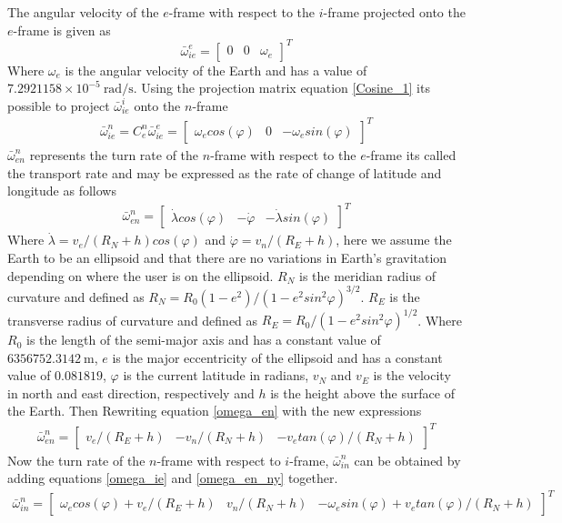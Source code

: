 The angular velocity of the $e$-frame with respect to the $i$-frame projected onto the $e$-frame is given as
\begin{equation}
\bar{\omega}_{ie}^e = 
\begin{bmatrix}
0 & 0 & \omega_e
\end{bmatrix}^T
\end{equation}
Where $\omega_e$ is the angular velocity of the Earth and has a value of
$7.2921158 \times 10^{-5}~\textrm{rad/s}$\cite{nonlinear}. Using the projection matrix equation \eqref{Cosine_1} its possible to project $\bar{\omega}_ {ie}^i$ onto the $n$-frame
\begin{align}
\bar{\omega}_{ie}^n=C_e^n\bar{\omega}_{ie}^e=
\begin{bmatrix}
\omega_e cos(\varphi) & 0 & -\omega_e sin(\varphi)
\end{bmatrix}^T
\label{omega_ie}
\end{align}
$\bar{\omega}_{en}^n$ represents the turn rate of the $n$-frame with respect to the $e$-frame its called the transport rate and may be expressed as the rate of change of latitude and longitude as follows
\begin{align}
\bar{\omega}_{en}^n=
\begin{bmatrix}
\dot{\lambda}cos(\varphi) & -\dot{\varphi} & -\dot{\lambda}sin(\varphi)
\end{bmatrix}^T
\label{omega_en}
\end{align}
Where $\dot{\lambda}=v_e/(R_N+h)cos(\varphi)$ and $\dot{\varphi}=v_n/(R_E+h)$, here we assume the Earth to be an ellipsoid and that there are no variations in Earth's gravitation depending on where the user is on the ellipsoid. $R_N$ is the meridian radius of curvature and defined as $R_N=R_0(1-e^2)/(1-e^2sin^2\varphi)^{3/2}$\cite{nonlinear}. $R_E$ is the transverse radius of curvature and defined as $R_E=R_0/(1-e^2sin^2\varphi)^{1/2}$. Where $R_0$ is the length of the semi-major axis and has a constant value of $6356752.3142~\textrm{m}$, $e$ is the major eccentricity of the ellipsoid and has a constant value of $0.081819$, $\varphi$ is the current latitude in radians, $v_N$ and $v_E$ is the velocity in north and east direction, respectively and $h$ is the height above the surface of the Earth. Then Rewriting equation \eqref{omega_en} with the new expressions
\begin{align}
\bar{\omega}_{en}^n=
\begin{bmatrix}
v_e/(R_E+h) & -v_n/(R_N+h) & -v_e tan(\varphi)/(R_N+h)
\end{bmatrix}^T \label{omega_en_ny}
\end{align}
Now the turn rate of the $n$-frame with respect to $i$-frame, $\bar{\omega}_{in}^n$ can be obtained by adding equations \eqref{omega_ie} and \eqref{omega_en_ny} together.
\begin{align}
\bar{\omega}_{in}^n=
\begin{bmatrix}
\omega_e cos(\varphi) + v_e/(R_E+h) & v_n/(R_N+h) & -\omega_e sin(\varphi) + v_e tan(\varphi)/(R_N+h)
\end{bmatrix}^T
\label{Eq.omega_in}
\end{align}

